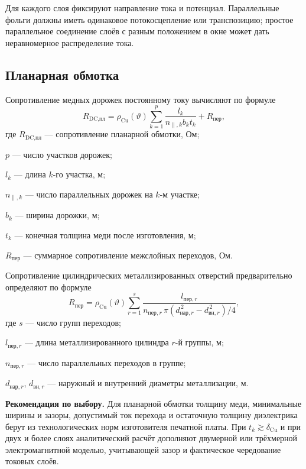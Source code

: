 \documentclass[14pt,a4paper]{extarticle}
\newcommand{\recommend}{\par\noindent\textbf{Рекомендация по выбору.} }
\begin{document}
Для каждого слоя фиксируют направление тока и потенциал. Параллельные фольги
должны иметь одинаковое потокосцепление или транспозицию; простое
параллельное соединение слоёв с разным положением в окне может дать
неравномерное распределение тока.

\subsection{Планарная обмотка}

Сопротивление медных дорожек постоянному току вычисляют по формуле
\begin{equation}
 R_{\text{DC,пл}}=
 \rho_{\text{Cu}}(\vartheta)
 \sum_{k=1}^{p}
 \frac{l_k}{n_{\parallel,k}b_k t_k}
 {}+R_{\text{пер}},
 \label{eq:planar-rdc}
\end{equation}
где $R_{\text{DC,пл}}$ --- сопротивление планарной обмотки, Ом;\par\noindent
$p$ --- число участков дорожек;\par\noindent
$l_k$ --- длина $k$-го участка, м;\par\noindent
$n_{\parallel,k}$ --- число параллельных дорожек на $k$-м участке;\par\noindent
$b_k$ --- ширина дорожки, м;\par\noindent
$t_k$ --- конечная толщина меди после изготовления, м;\par\noindent
$R_{\text{пер}}$ --- суммарное сопротивление межслойных переходов, Ом.

Сопротивление цилиндрических металлизированных отверстий предварительно
определяют по формуле
\begin{equation}
 R_{\text{пер}}=
 \rho_{\text{Cu}}(\vartheta)
 \sum_{r=1}^{s}
 \frac{l_{\text{пер},r}}
 {n_{\text{пер},r}\,
 \pi\!\left(d_{\text{нар},r}^{\,2}-d_{\text{вн},r}^{\,2}\right)/4},
 \label{eq:via-resistance}
\end{equation}
где $s$ --- число групп переходов;\par\noindent
$l_{\text{пер},r}$ --- длина металлизированного цилиндра $r$-й группы,
м;\par\noindent
$n_{\text{пер},r}$ --- число параллельных переходов в группе;\par\noindent
$d_{\text{нар},r}$, $d_{\text{вн},r}$ --- наружный и внутренний диаметры
металлизации, м.

\recommend Для планарной обмотки толщину меди, минимальные ширины и
зазоры, допустимый ток перехода и остаточную толщину диэлектрика берут
из технологических норм изготовителя печатной платы. При
$t_k\gtrsim\delta_{\text{Cu}}$ и при двух и более слоях аналитический
расчёт дополняют двумерной или трёхмерной электромагнитной моделью,
учитывающей зазор и фактическое чередование токовых слоёв.
\end{document}
